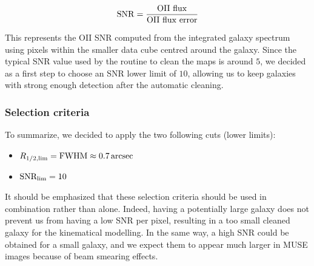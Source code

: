 \begin{equation}
	\rm{SNR} = \frac{\rm{OII \,\, flux}}{\rm{OII \,\, flux \,\, error}}
\end{equation}

This represents the OII SNR computed from the integrated galaxy spectrum using pixels within the smaller data cube centred around the galaxy. Since the typical SNR value used by the routine to clean the maps is around $5$, we decided as a first step to choose an SNR lower limit of $10$, allowing us to keep galaxies with strong enough detection after the automatic cleaning.

\subsubsection{Selection criteria}

To summarize, we decided to apply the two following cuts (lower limits):

\begin{itemize}
	\item $R_{1/2 , \rm{lim}} = \rm{FWHM} \approx \SI{0.7}{arcsec}$
	\item $\rm{SNR_{lim}} = 10$
\end{itemize}

It should be emphasized that these selection criteria should be used in combination rather than alone. Indeed, having a potentially large galaxy does not prevent us from having a low SNR per pixel, resulting in a too small cleaned galaxy for the kinematical modelling. In the same way, a high SNR could be obtained for a small galaxy, and we expect them to appear much larger in MUSE images because of beam smearing effects.





 
